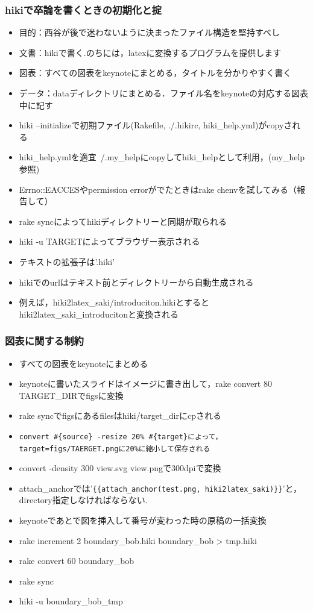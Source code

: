 \subsubsection{hikiで卒論を書くときの初期化と掟}
\begin{itemize}
\item 目的：西谷が後で迷わないように決まったファイル構造を堅持すべし
\item 文書：hikiで書く.のちには，latexに変換するプログラムを提供します
\item 図表：すべての図表をkeynoteにまとめる，タイトルを分かりやすく書く
\item データ：dataディレクトリにまとめる．ファイル名をkeynoteの対応する図表中に記す
\item hiki --initializeで初期ファイル(Rakefile, ./.hikirc, hiki\_help.yml)がcopyされる
\item hiki\_help.ymlを適宜~/.my\_helpにcopyしてhiki\_helpとして利用，(my\_help参照)
\item Errno::EACCESやpermission errorがでたときはrake chenvを試してみる（報告して）
\item rake syncによってhikiディレクトリーと同期が取られる
\item hiki -u TARGETによってブラウザー表示される
\item テキストの拡張子は'.hiki'
\item hikiでのurlはテキスト前とディレクトリーから自動生成される
\item 例えば，hiki2latex\_saki/introduciton.hikiとするとhiki2latex\_saki\_introducitonと変換される
\end{itemize}
\subsubsection{図表に関する制約}
\begin{itemize}
\item すべての図表をkeynoteにまとめる
\item keynoteに書いたスライドはイメージに書き出して，rake convert 80 TARGET\_DIRでfigsに変換
\item rake syncでfigsにあるfilesはhiki/target\_dirにcpされる
\item \verb|convert #{source} -resize 20% #{target}によって，target=figs/TAERGET.pngに20%に縮小して保存される|
\item convert -density 300 view.svg view.pngで300dpiで変換
\item attach\_anchorでは'\verb|{{attach_anchor(test.png, hiki2latex_saki)}}|'と，directory指定しなければならない.
\item keynoteであとで図を挿入して番号が変わった時の原稿の一括変換
\item rake increment 2 boundary\_bob.hiki boundary\_bob > tmp.hiki
\item rake convert 60 boundary\_bob
\item rake sync
\item hiki -u boundary\_bob\_tmp
\end{itemize}
